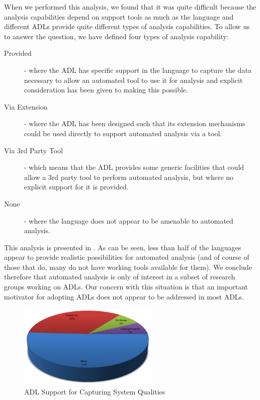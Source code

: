 When we performed this analysis, we found that it was quite difficult because the analysis capabilities depend on support tools as much as the language and different ADLs provide quite different types of analysis capabilities.  To allow us to answer the question, we have defined four types of analysis capability:
\begin{description}
	\item [Provided] - where the ADL has specific support in the language to capture the data necessary to allow an automated tool to use it for analysis and explicit consideration has been given to making this possible.
	\item[Via Extension] - where the ADL has been designed such that its extension mechanisms could be used directly to support automated analysis via a tool.
	\item[Via 3rd Party Tool] - which means that the ADL provides some generic facilities that could allow a 3rd party tool to perform automated analysis, but where no explicit support for it is provided.
	\item[None] - where the language does not appear to be amenable to automated analysis.
\end{description}

This analysis is presented in .  As can be seen, less than half of the languages appear to provide realistic possibilities for automated analysis (and of course of those that do, many do not have working tools available for them).  We conclude therefore that automated analysis is only of interest in a subset of research groups working on ADLs.  Our concern with this situation is that an important motivator for adopting ADLs does not appear to be addressed in most ADLs.

\begin{figure}
\centering
\includegraphics[width=0.6\textwidth]{Figures/litreview-adl-qualities}
\caption{ADL Support for Capturing System Qualities}
\label{figure:litreview-adl-qualities}
\end{figure}

